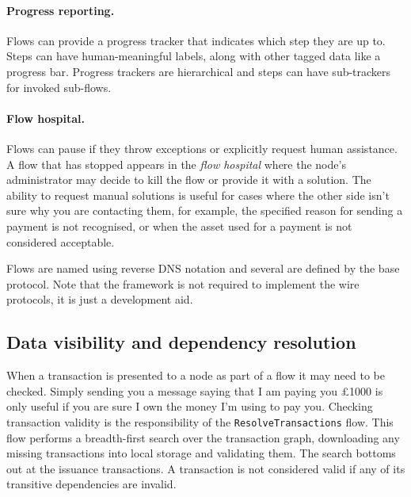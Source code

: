 \documentclass{article}
\begin{document}
\paragraph{Progress reporting.}Flows can provide a progress tracker that indicates which step they are up to. Steps can
have human-meaningful labels, along with other tagged data like a progress bar. Progress trackers are hierarchical and
steps can have sub-trackers for invoked sub-flows.

\paragraph{Flow hospital.}Flows can pause if they throw exceptions or explicitly request human assistance. A flow that
has stopped appears in the \emph{flow hospital} where the node's administrator may decide to kill the flow or provide it
with a solution. The ability to request manual solutions is useful for cases where the other side isn't sure why you
are contacting them, for example, the specified reason for sending a payment is not recognised, or when the asset used for
a payment is not considered acceptable.

Flows are named using reverse DNS notation and several are defined by the base protocol. Note that the framework is
not required to implement the wire protocols, it is just a development aid.


\subsection{Data visibility and dependency resolution}

When a transaction is presented to a node as part of a flow it may need to be checked. Simply sending you
a message saying that I am paying you \pounds1000 is only useful if you are sure I own the money I'm using to pay you.
Checking transaction validity is the responsibility of the \texttt{ResolveTransactions} flow. This flow performs
a breadth-first search over the transaction graph, downloading any missing transactions into local storage and
validating them. The search bottoms out at the issuance transactions. A transaction is not considered valid if
any of its transitive dependencies are invalid.
\end{document}
